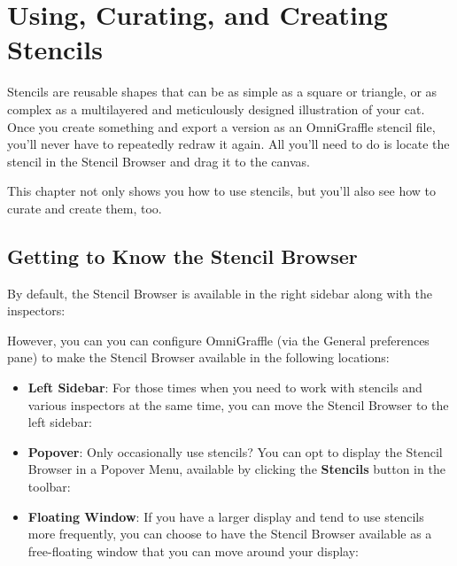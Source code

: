 \documentclass[../main.tex]{subfiles}
\begin{document}
\chapter{Using, Curating, and Creating Stencils}

Stencils are reusable shapes that can be as simple as a square or triangle, or as complex as a
multilayered and meticulously designed illustration of your cat. Once you create something and
export a version as an OmniGraffle stencil file, you'll never have to repeatedly redraw it
again. All you'll need to do is locate the stencil in the Stencil Browser and drag it to the
canvas.

This chapter not only shows you how to use stencils, but you'll also see how to curate and
create them, too.

\section{Getting to Know the Stencil Browser}

By default, the Stencil Browser is available in the right sidebar along with the inspectors:


However, you can you can configure OmniGraffle (via the General preferences pane) to make the
Stencil Browser available in the following locations:


\begin{itemize}
  \item \textbf{Left Sidebar}: For those times when you need to work with stencils and various
    inspectors at the same time, you can move the Stencil Browser to the left sidebar:

  \item \textbf{Popover}: Only occasionally use stencils? You can opt to display the Stencil
    Browser in a Popover Menu, available by clicking the \textbf{Stencils} button in the
    toolbar:

  \item \textbf{Floating Window}: If you have a larger display and tend to use stencils more
    frequently, you can choose to have the Stencil Browser available as a free-floating window
    that you can move around your display:

\end{itemize}
\end{document}
